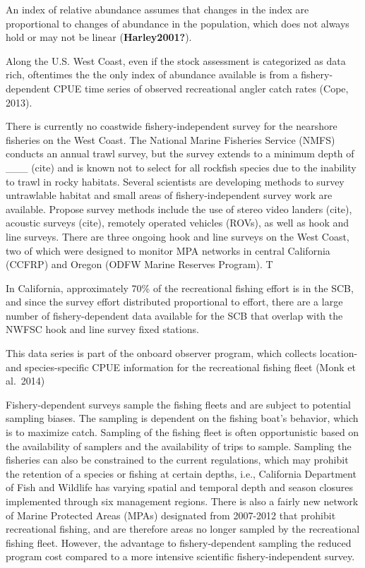\documentclass[]{elsarticle} %
\begin{document}
An index of relative abundance assumes that changes in the index are
proportional to changes of abundance in the population, which does not
always hold or may not be linear (\textbf{Harley2001?}).

Along the U.S. West Coast, even if the stock assessment is categorized
as data rich, oftentimes the the only index of abundance available is
from a fishery-dependent CPUE time series of observed recreational
angler catch rates (Cope, 2013).

There is currently no coastwide fishery-independent survey for the
nearshore fisheries on the West Coast. The National Marine Fisheries
Service (NMFS) conducts an annual trawl survey, but the survey extends
to a minimum depth of \_\_\_ (cite) and is known not to select for all
rockfish species due to the inability to trawl in rocky habitats.
Several scientists are developing methods to survey untrawlable habitat
and small areas of fishery-independent survey work are available.
Propose survey methods include the use of stereo video landers (cite),
acoustic surveys (cite), remotely operated vehicles (ROVs), as well as
hook and line surveys. There are three ongoing hook and line surveys on
the West Coast, two of which were designed to monitor MPA networks in
central California (CCFRP) and Oregon (ODFW Marine Reserves Program). T

In California, approximately 70\% of the recreational fishing effort is
in the SCB, and since the survey effort distributed proportional to
effort, there are a large number of fishery-dependent data available for
the SCB that overlap with the NWFSC hook and line survey fixed stations.

This data series is part of the onboard observer program, which collects
location- and species-specific CPUE information for the recreational
fishing fleet (Monk et al.~2014)

Fishery-dependent surveys sample the fishing fleets and are subject to
potential sampling biases. The sampling is dependent on the fishing
boat's behavior, which is to maximize catch. Sampling of the fishing
fleet is often opportunistic based on the availability of samplers and
the availability of trips to sample. Sampling the fisheries can also be
constrained to the current regulations, which may prohibit the retention
of a species or fishing at certain depths, i.e., California Department
of Fish and Wildlife has varying spatial and temporal depth and season
closures implemented through six management regions. There is also a
fairly new network of Marine Protected Areas (MPAs) designated from
2007-2012 that prohibit recreational fishing, and are therefore areas no
longer sampled by the recreational fishing fleet. However, the advantage
to fishery-dependent sampling the reduced program cost compared to a
more intensive scientific fishery-independent survey.
\end{document}
